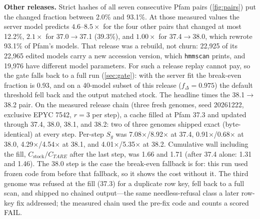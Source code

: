 \documentclass[letterpaper,twocolumn,10pt]{article}
\theoremstyle{definition}
\newcommand{\sys}{TARE\xspace}
\newcommand{\sys}{PARE\xspace}
\begin{document}
\textbf{Other releases.} Strict hashes of all seven consecutive Pfam pairs (\cref{fig:pairs}) put the changed fraction
between 2.0\% and 93.1\%. At those measured values the server model predicts $4.6$--$8.5\times$ for the four other pairs that
changed at most 12.2\%, $2.1\times$ for 37.0$\rightarrow$37.1 (39.3\%), and $1.00\times$ for 37.4$\rightarrow$38.0, which rewrote
93.1\% of Pfam's models. That release was a rebuild, not churn: 22{,}925 of its 22{,}965 edited models carry a new
accession version, which \texttt{hmmscan} prints, and 19{,}976 have different model parameters. For such a release replay
cannot pay, so the gate falls back to a full run (\cref{sec:gate}): with the server fit the break\nobreakdash-even fraction is
0.93, and on a 40\nobreakdash-model subset of this release ($f_\Delta = 0.975$) the default threshold fell back and the output
matched stock.
The headline times the 38.1$\rightarrow$38.2 pair. On the measured release chain (three fresh genomes, seed 20261222,
exclusive EPYC 7542, $r{=}3$ per step), a cache filled at Pfam 37.3 and updated through 37.4, 38.0, 38.1, and 38.2:
two of three genomes shipped exact (byte\nobreakdash-identical) at every step. Per\nobreakdash-step $S_g$ was
7.08$\times$/8.92$\times$ at 37.4, 0.91$\times$/0.68$\times$ at 38.0, 4.29$\times$/4.54$\times$ at 38.1, and
4.01$\times$/5.35$\times$ at 38.2. Cumulative wall including the fill, $C_{\mathrm{stock}}/C_{\sys}$ after the last
step, was 1.66 and 1.71 (after 37.4 alone: 1.31 and 1.46). The 38.0 step is the case the break\nobreakdash-even fallback
is for: this run used frozen code from before that fallback, so it shows the cost without it. The third genome was
refused at the fill (37.3) for a duplicate row key, fell back to a full scan, and shipped no chained output---the same
needless\nobreakdash-refusal class a later row\nobreakdash-key fix addressed; the measured chain used the pre\nobreakdash-fix
code and counts a scored FAIL.
\end{document}
